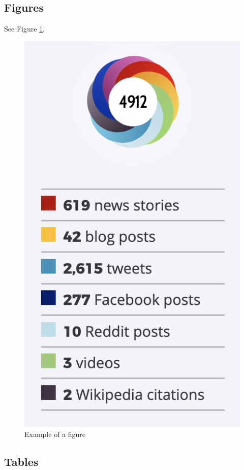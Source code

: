\documentclass{article}
\begin{document}
\subsection{Figures}

See Figure \ref{fig:altmetric}.

\begin{figure} %
    \centering
    \includegraphics{altmetric.png}
    \caption{Example of a figure}
    \label{fig:altmetric}
\end{figure}

\subsection{Tables}
\end{document}
